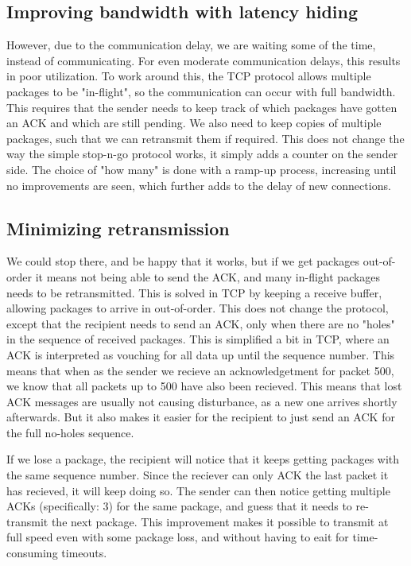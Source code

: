 \subsection{Improving bandwidth with latency hiding}
However, due to the communication delay, we are waiting some of the time, instead of communicating. For even moderate communication delays, this results in poor utilization. To work around this, the TCP protocol allows multiple packages to be "in-flight", so the communication can occur with full bandwidth. This requires that the sender needs to keep track of which packages have gotten an ACK and which are still pending. We also need to keep copies of multiple packages, such that we can retransmit them if required. This does not change the way the simple stop-n-go protocol works, it simply adds a counter on the sender side. The choice of "how many" is done with a ramp-up process, increasing until no improvements are seen, which further adds to the delay of new connections.

\subsection{Minimizing retransmission}
We could stop there, and be happy that it works, but if we get packages out-of-order it means not being able to send the ACK, and many in-flight packages needs to be retransmitted. This is solved in TCP by keeping a receive buffer, allowing packages to arrive in out-of-order. This does not change the protocol, except that the recipient needs to send an ACK, only when there are no "holes" in the sequence of received packages. This is simplified a bit in TCP, where an ACK is interpreted as vouching for all data up until the sequence number. This means that when as the sender we recieve an acknowledgetment for packet 500, we know that all packets up to 500 have also been recieved. This means that lost ACK messages are usually not causing disturbance, as a new one arrives shortly afterwards. But it also makes it easier for the recipient to just send an ACK for the full no-holes sequence.

If we lose a package, the recipient will notice that it keeps getting packages with the same sequence number. Since the reciever can only ACK the last packet it has recieved, it will keep doing so. The sender can then notice getting multiple ACKs (specifically: 3) for the same package, and guess that it needs to re-transmit the next package. This improvement makes it possible to transmit at full speed even with some package loss, and without having to eait for time-consuming timeouts.

